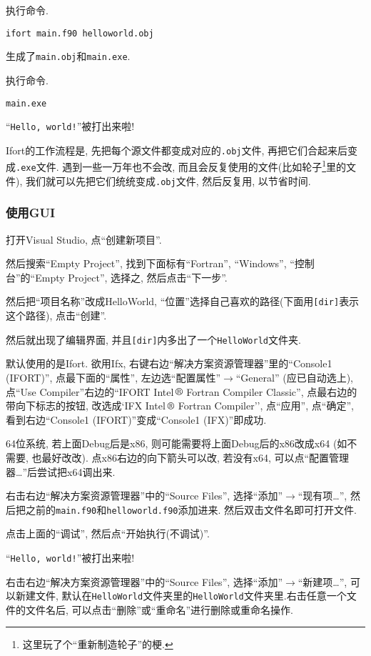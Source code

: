 执行命令.
\begin{lstlisting}
ifort main.f90 helloworld.obj
\end{lstlisting}
生成了\verb|main.obj|和\verb|main.exe|.

执行命令.
\begin{lstlisting}
main.exe
\end{lstlisting}
``\verb|Hello, world!|''被打出来啦!

Ifort的工作流程是, 先把每个源文件都变成对应的\verb|.obj|文件, 再把它们合起来后变成\verb|.exe|文件. 遇到一些一万年也不会改, 而且会反复使用的文件(比如轮子\footnote{
    这里玩了个``重新制造轮子''的梗.
}里的文件), 我们就可以先把它们统统变成\verb|.obj|文件, 然后反复用, 以节省时间.

\subsubsection{使用GUI}

打开Visual Studio, 点``创建新项目''.

然后搜索``Empty Project'', 找到下面标有``Fortran'', ``Windows'', ``控制台''的``Empty Project'', 选择之, 然后点击``下一步''.

然后把``项目名称''改成HelloWorld, ``位置''选择自己喜欢的路径(下面用\verb|[dir]|表示这个路径), 点击``创建''.

然后就出现了编辑界面, 并且\verb|[dir]|内多出了一个\verb|HelloWorld|文件夹.

默认使用的是Ifort. 欲用Ifx, 右键右边``解决方案资源管理器''里的``Console1 (IFORT)'', 点最下面的``属性'', 左边选``配置属性''$\rightarrow$``General'' (应已自动选上), 点``Use Compiler''右边的``IFORT Intel$\,\text{\textregistered}$ Fortran Compiler Classic'', 点最右边的带向下标志的按钮, 改选成`IFX Intel$\,\text{\textregistered}$ Fortran Compiler'', 点``应用'', 点``确定'', 看到右边``Console1 (IFORT)''变成``Console1 (IFX)''即成功.

64位系统, 若上面Debug后是x86, 则可能需要将上面Debug后的x86改成x64 (如不需要, 也最好改改). 点x86右边的向下箭头可以改, 若没有x64, 可以点``配置管理器\dots''后尝试把x64调出来.

右击右边``解决方案资源管理器''中的``Source Files'', 选择``添加''$\rightarrow$``现有项\dots'', 然后把之前的\verb|main.f90|和\verb|helloworld.f90|添加进来. 然后双击文件名即可打开文件.

点击上面的``调试'', 然后点``开始执行(不调试)''.

``\verb|Hello, world!|''被打出来啦!

右击右边``解决方案资源管理器''中的``Source Files'', 选择``添加''$\rightarrow$``新建项\dots'', 可以新建文件, 默认在\verb|HelloWorld|文件夹里的\verb|HelloWorld|文件夹里.右击任意一个文件的文件名后, 可以点击``删除''或``重命名''进行删除或重命名操作.

